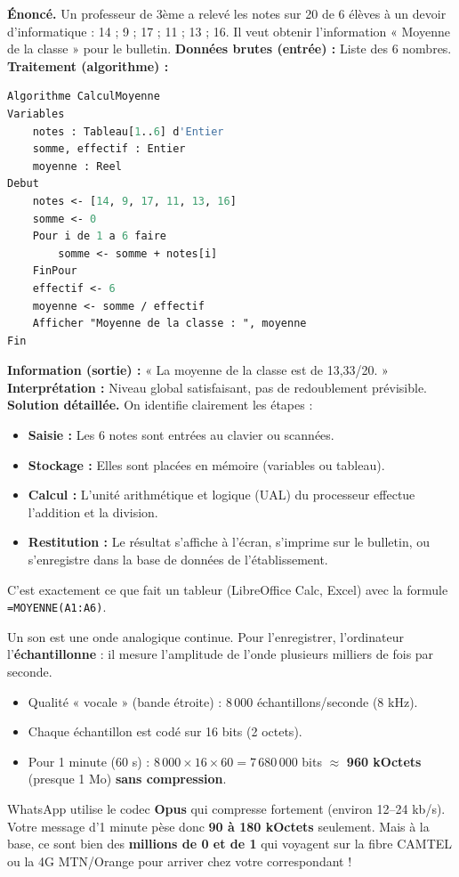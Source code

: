 \documentclass[11pt]{article}
\begin{document}
\begin{exoresolu}
\textbf{Énoncé.} Un professeur de 3ème a relevé les notes sur 20 de 6 élèves à un devoir d'informatique : 14 ; 9 ; 17 ; 11 ; 13 ; 16. Il veut obtenir l'information « Moyenne de la classe » pour le bulletin.
\textbf{Données brutes (entrée) :} Liste des 6 nombres.
\textbf{Traitement (algorithme) :}
\begin{lstlisting}[language=pascal]
Algorithme CalculMoyenne
Variables
    notes : Tableau[1..6] d'Entier
    somme, effectif : Entier
    moyenne : Reel
Debut
    notes <- [14, 9, 17, 11, 13, 16]
    somme <- 0
    Pour i de 1 a 6 faire
        somme <- somme + notes[i]
    FinPour
    effectif <- 6
    moyenne <- somme / effectif
    Afficher "Moyenne de la classe : ", moyenne
Fin
\end{lstlisting}
\textbf{Information (sortie) :} « La moyenne de la classe est de 13,33/20. »
\textbf{Interprétation :} Niveau global satisfaisant, pas de redoublement prévisible.
\tcblower
\textbf{Solution détaillée.}
On identifie clairement les étapes :
\begin{itemize}
    \item \textbf{Saisie :} Les 6 notes sont entrées au clavier ou scannées.
    \item \textbf{Stockage :} Elles sont placées en mémoire (variables ou tableau).
    \item \textbf{Calcul :} L'unité arithmétique et logique (UAL) du processeur effectue l'addition et la division.
    \item \textbf{Restitution :} Le résultat s'affiche à l'écran, s'imprime sur le bulletin, ou s'enregistre dans la base de données de l'établissement.
\end{itemize}
C'est exactement ce que fait un tableur (LibreOffice Calc, Excel) avec la formule \texttt{=MOYENNE(A1:A6)}.
\end{exoresolu}

\begin{savaistu}
Un son est une onde analogique continue. Pour l'enregistrer, l'ordinateur l'\textbf{échantillonne} : il mesure l'amplitude de l'onde plusieurs milliers de fois par seconde.
\begin{itemize}
    \item Qualité « vocale » (bande étroite) : 8\,000 échantillons/seconde (8 kHz).
    \item Chaque échantillon est codé sur 16 bits (2 octets).
    \item Pour 1 minute (60 s) : $8\,000 \times 16 \times 60 = 7\,680\,000$ bits $\approx$ \textbf{960 kOctets} (presque 1 Mo) \textbf{sans compression}.
\end{itemize}
WhatsApp utilise le codec \textbf{Opus} qui compresse fortement (environ 12--24 kb/s). Votre message d'1 minute pèse donc \textbf{90 à 180 kOctets} seulement. Mais à la base, ce sont bien des \textbf{millions de 0 et de 1} qui voyagent sur la fibre CAMTEL ou la 4G MTN/Orange pour arriver chez votre correspondant !
\end{savaistu}
\end{document}

